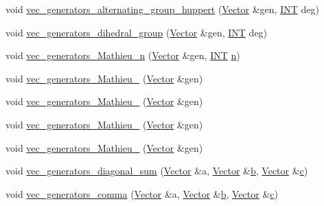 \begin{DoxyCompactItemize}
\item 
void \mbox{\hyperlink{perm__group__gens_8_c_a5c62097e9ad2623b09a8dfbe9380db7d}{vec\+\_\+generators\+\_\+alternating\+\_\+group\+\_\+huppert}} (\mbox{\hyperlink{class_vector}{Vector}} \&gen, \mbox{\hyperlink{galois_8h_a09fddde158a3a20bd2dcadb609de11dc}{I\+NT}} deg)
\item 
void \mbox{\hyperlink{perm__group__gens_8_c_a907f18425762b941f30b5f833116b8b0}{vec\+\_\+generators\+\_\+dihedral\+\_\+group}} (\mbox{\hyperlink{class_vector}{Vector}} \&gen, \mbox{\hyperlink{galois_8h_a09fddde158a3a20bd2dcadb609de11dc}{I\+NT}} deg)
\item 
void \mbox{\hyperlink{perm__group__gens_8_c_a82bad2f129ab5f3daafc1a84a29d5dba}{vec\+\_\+generators\+\_\+\+Mathieu\+\_\+n}} (\mbox{\hyperlink{class_vector}{Vector}} \&gen, \mbox{\hyperlink{galois_8h_a09fddde158a3a20bd2dcadb609de11dc}{I\+NT}} \mbox{\hyperlink{simeon_8_c_a7f2cd26777ce0ff3fdaf8d02aacbddfb}{n}})
\item 
void \mbox{\hyperlink{perm__group__gens_8_c_a79f40f9f619ba6f8a6c32e6c1df04e52}{vec\+\_\+generators\+\_\+\+Mathieu\+\_}} (\mbox{\hyperlink{class_vector}{Vector}} \&gen)
\item 
void \mbox{\hyperlink{perm__group__gens_8_c_a07c56b14e85701ba7f5105d7c953175b}{vec\+\_\+generators\+\_\+\+Mathieu\+\_}} (\mbox{\hyperlink{class_vector}{Vector}} \&gen)
\item 
void \mbox{\hyperlink{perm__group__gens_8_c_a6728e2b0fff129a1db3e8d0dc8c86304}{vec\+\_\+generators\+\_\+\+Mathieu\+\_}} (\mbox{\hyperlink{class_vector}{Vector}} \&gen)
\item 
void \mbox{\hyperlink{perm__group__gens_8_c_a2fc2258663a8a040ec6eca37c3ff1bf9}{vec\+\_\+generators\+\_\+\+Mathieu\+\_}} (\mbox{\hyperlink{class_vector}{Vector}} \&gen)
\item 
void \mbox{\hyperlink{perm__group__gens_8_c_a495e8fc7eb66aa894326671762caae26}{vec\+\_\+generators\+\_\+diagonal\+\_\+sum}} (\mbox{\hyperlink{class_vector}{Vector}} \&a, \mbox{\hyperlink{class_vector}{Vector}} \&\mbox{\hyperlink{alphabet2_8_c_a148e3876077787926724625411d6e7a9}{b}}, \mbox{\hyperlink{class_vector}{Vector}} \&\mbox{\hyperlink{alphabet2_8_c_a4e1e0e72dd773439e333c84dd762a9c3}{c}})
\item 
void \mbox{\hyperlink{perm__group__gens_8_c_a3b4aa49d08bb6b5c3869db345c80e4b3}{vec\+\_\+generators\+\_\+comma}} (\mbox{\hyperlink{class_vector}{Vector}} \&a, \mbox{\hyperlink{class_vector}{Vector}} \&\mbox{\hyperlink{alphabet2_8_c_a148e3876077787926724625411d6e7a9}{b}}, \mbox{\hyperlink{class_vector}{Vector}} \&\mbox{\hyperlink{alphabet2_8_c_a4e1e0e72dd773439e333c84dd762a9c3}{c}})

\end{DoxyCompactItemize}
